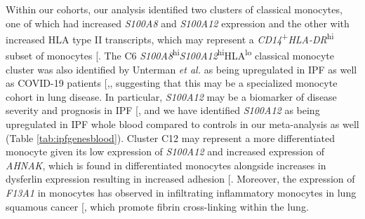 \documentclass[
]{article}
\begin{document}
Within our cohorts, our analysis identified two clusters of classical monocytes, one of which had increased \textit{S100A8} and \textit{S100A12} expression and the other with increased HLA type II transcripts, which may represent a \textit{CD14}\textsuperscript{+}\textit{HLA-DR}\textsuperscript{hi} subset of monocytes {[}\citeproc{ref-evren_distinct_2021}{169}{]}. The C6 \textit{S100A8}\textsuperscript{hi}\textit{S100A12}\textsuperscript{hi}HLA\textsuperscript{lo} classical monocyte cluster was also identified by Unterman \textit{et al.} as being upregulated in IPF as well as COVID-19 patients {[},\citeproc{ref-unterman_single-cell_2022}{170}{]}, suggesting that this may be a specialized monocyte cohort in lung disease. In particular, \textit{S100A12} may be a biomarker of disease severity and prognosis in IPF {[}\citeproc{ref-li_s100a12_2022}{171}{]}, and we have identified \textit{S100A12} as being upregulated in IPF whole blood compared to controls in our meta-analysis as well (Table \ref{tab:ipfgenesblood}). Cluster C12 may represent a more differentiated monocyte given its low expression of \textit{S100A12} and increased expression of \textit{AHNAK}, which is found in differentiated monocytes alongside increases in dysferlin expression resulting in increased adhesion {[}\citeproc{ref-de_morree_dysferlin_2013}{172}{]}. Moreover, the expression of \textit{F13A1} in monocytes has observed in infiltrating inflammatory monocytes in lung squamous cancer {[}\citeproc{ref-porrello_factor_2018}{173}{]}, which promote fibrin cross-linking within the lung.
\end{document}

